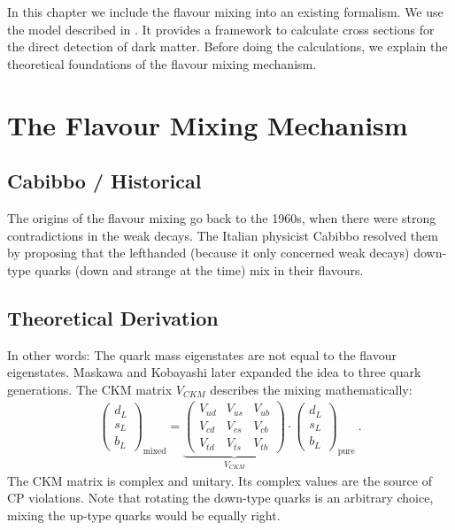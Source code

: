 
In this chapter we include the flavour mixing into an existing formalism. We use the model described in \cite{ChiralEFT}. It provides a framework to calculate cross sections for the direct detection of dark matter. Before doing the calculations, we explain the theoretical foundations of the flavour mixing mechanism.

\section{The Flavour Mixing Mechanism}
\cite[Chapter 20]{Peskin}
\cite[Chapter 1]{Tevatron}
\subsection{Cabibbo / Historical}
The origins of the flavour mixing go back to the 1960s, when there were strong contradictions in the weak decays. The Italian physicist Cabibbo resolved them by proposing that the lefthanded (because it only concerned weak decays) down-type quarks (down and strange at the time) mix in their flavours.
\subsection{Theoretical Derivation}
In other words: The quark mass eigenstates are not equal to the flavour eigenstates. Maskawa and Kobayashi later expanded the idea to three quark generations. The CKM matrix $V_{CKM}$ describes the mixing mathematically:
\begin{align}
	\begin{pmatrix}
	d_L \\ s_L \\ b_L
	\end{pmatrix}_\text{mixed} = \underbrace{\begin{pmatrix}
	V_{ud} & V_{us} & V_{ub} \\
	V_{cd} & V_{cs} & V_{cb} \\
	V_{td} & V_{ts} & V_{tb}
	\end{pmatrix}}_{V_{CKM}}\cdot\begin{pmatrix}
	d_L \\ s_L \\ b_L
	\end{pmatrix}_\text{pure} \ .
\end{align}
The CKM matrix is complex and unitary. Its complex values are the source of CP violations. Note that rotating the down-type quarks is an arbitrary choice, mixing the up-type quarks would be equally right.

